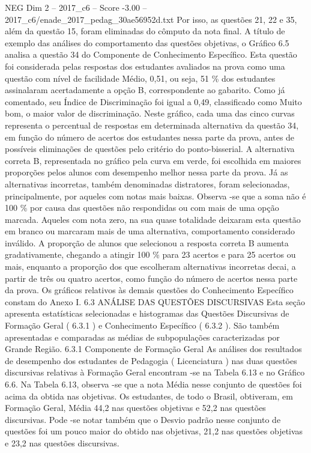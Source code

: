 \begin{textsample}{NEG Dim 2 – 2017\_c6 – Score -3.00 – 2017\_c6/enade\_2017\_pedag\_30ae56952d.txt}
Por isso, as questões 21, 22 e 35, além da questão 15, foram eliminadas do cômputo da nota final.
A título de exemplo das análises do comportamento das questões objetivas, o Gráfico 6.5 analisa a questão 34 do Componente de Conhecimento Específico.
Esta questão foi considerada pelas respostas dos estudantes avaliados na prova como uma questão com nível de facilidade Médio, 0,51, ou seja, 51 \% dos estudantes assinalaram acertadamente a opção B, correspondente ao gabarito.
Como já comentado, seu Índice de Discriminação foi igual a 0,49, classificado como Muito bom, o maior valor de discriminação.
Neste gráfico, cada uma das cinco curvas representa o percentual de respostas em determinada alternativa da questão 34, em função do número de acertos dos estudantes nessa parte da prova, antes de possíveis eliminações de questões pelo critério do ponto-bisserial.
A alternativa correta B, representada no gráfico pela curva em verde, foi escolhida em maiores proporções pelos alunos com desempenho melhor nessa parte da prova.
Já as alternativas incorretas, também denominadas distratores, foram selecionadas, principalmente, por aqueles com notas mais baixas.
Observa -se que a soma não é 100 \% por causa das questões não respondidas ou com mais de uma opção marcada.
Aqueles com nota zero, na sua quase totalidade deixaram esta questão em branco ou marcaram mais de uma alternativa, comportamento considerado inválido.
A proporção de alunos que selecionou a resposta correta B aumenta gradativamente, chegando a atingir 100 \% para 23 acertos e para 25 acertos ou mais, enquanto a proporção dos que escolheram alternativas incorretas decai, a partir de três ou quatro acertos, como função do número de acertos nessa parte da prova.
Os gráficos relativos às demais questões do Conhecimento Específico constam do Anexo I. 6.3 ANÁLISE DAS QUESTÕES DISCURSIVAS Esta seção apresenta estatísticas selecionadas e histogramas das Questões Discursivas de Formação Geral ( 6.3.1 ) e Conhecimento Específico ( 6.3.2 ).
São também apresentadas e comparadas as médias de subpopulações caracterizadas por Grande Região. 6.3.1 Componente de Formação Geral As análises dos resultados de desempenho dos estudantes de Pedagogia ( Licenciatura ) nas duas questões discursivas relativas à Formação Geral encontram -se na Tabela 6.13 e no Gráfico 6.6.
Na Tabela 6.13, observa -se que a nota Média nesse conjunto de questões foi acima da obtida nas objetivas.
Os estudantes, de todo o Brasil, obtiveram, em Formação Geral, Média 44,2 nas questões objetivas e 52,2 nas questões discursivas.
Pode -se notar também que o Desvio padrão nesse conjunto de questões foi um pouco maior do obtido nas objetivas, 21,2 nas questões objetivas e 23,2 nas questões discursivas.

\end{textsample}
